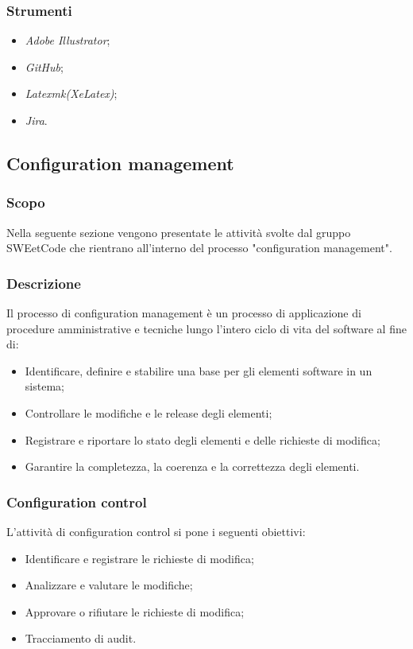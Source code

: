 \documentclass[10pt, a4paper]{article}
\begin{document}
\subsubsection{Strumenti}
\begin{itemize}
    \item \textit{Adobe Illustrator};
    \item \textit{GitHub};
    \item \textit{Latexmk(XeLatex)};
    \item \textit{Jira}.
\end{itemize}

\subsection{Configuration management}
\label{sec:configuration_control}
\subsubsection{Scopo}
Nella seguente sezione vengono presentate le attività svolte dal gruppo SWEetCode che rientrano all'interno del processo "configuration management".

\subsubsection{Descrizione}
Il processo di configuration management è un processo di applicazione di procedure amministrative e tecniche lungo l'intero ciclo di vita del software al fine di:
\begin{itemize}
    \item Identificare, definire e stabilire una base per gli elementi software in un sistema;
    \item Controllare le modifiche e le release degli elementi;
    \item Registrare e riportare lo stato degli elementi e delle richieste di modifica;
    \item Garantire la completezza, la coerenza e la correttezza degli elementi.
\end{itemize}

\subsubsection{Configuration control}
L'attività di configuration control si pone i seguenti obiettivi:
\begin{itemize}
    \item Identificare e registrare le richieste di modifica;
    \item Analizzare e valutare le modifiche;
    \item Approvare o rifiutare le richieste di modifica;
    \item Tracciamento di audit.
\end{itemize}
\end{document}
